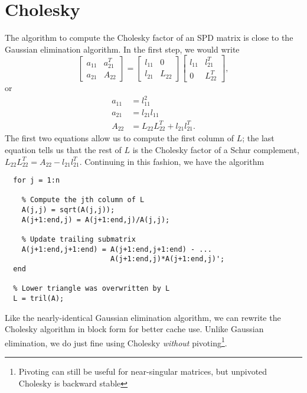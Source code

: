 \section{Cholesky}

The algorithm to compute the Cholesky factor of an SPD matrix is
close to the Gaussian elimination algorithm.  In the first step,
we would write
\[
  \begin{bmatrix}
    a_{11} & a_{21}^T \\
    a_{21} & A_{22}
  \end{bmatrix} =
  \begin{bmatrix}
    l_{11} & 0 \\
    l_{21} & L_{22}
  \end{bmatrix}
  \begin{bmatrix}
    l_{11} & l_{21}^T \\
        0 & L_{22}^T
  \end{bmatrix},
\]
or
\begin{align*}
  a_{11} &= l_{11}^2 \\
  a_{21} &= l_{21} l_{11} \\
  A_{22} &= L_{22} L_{22}^T + l_{21} l_{21}^T.
\end{align*}
The first two equations allow us to compute the first column of $L$;
the last equation tells us that the rest of $L$ is the Cholesky factor
of a Schur complement, $L_{22} L_{22}^T = A_{22} - l_{21} l_{21}^T$.
Continuing in this fashion, we have the algorithm
\begin{lstlisting}
  for j = 1:n

    % Compute the jth column of L
    A(j,j) = sqrt(A(j,j));
    A(j+1:end,j) = A(j+1:end,j)/A(j,j);

    % Update trailing submatrix
    A(j+1:end,j+1:end) = A(j+1:end,j+1:end) - ...
                         A(j+1:end,j)*A(j+1:end,j)';
  end

  % Lower triangle was overwritten by L
  L = tril(A);
\end{lstlisting}
Like the nearly-identical Gaussian elimination algorithm, we can
rewrite the Cholesky algorithm in block form for better cache use.
Unlike Gaussian elimination, we do just fine using Cholesky {\em without}
pivoting\footnote{Pivoting can still be useful for near-singular matrices,
but unpivoted Cholesky is backward stable}.
